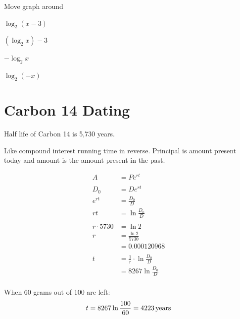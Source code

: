 \documentclass{exam}
\begin{document}
  Move graph around
  \begin{itemize*}
    \item $\log_2 (x - 3)$
    \item $(\log_2 x) - 3$
    \item $- \log_2 x$
    \item $\log_2 (-x)$
  \end{itemize*}
  
  \pagebreak

  \section{Carbon 14 Dating}

  Half life of Carbon 14 is 5,730 years.

  Like compound interest running time in reverse. Principal is amount present today and amount is the amount present in
  the past.

  \begin{align*}
    A      &= P e^{rt} \\
    \\
    D_0    &= D e^{rt} \\
    e^{rt} &= \frac{D_0}{D} \\
    rt     &= \ln{\frac{D_0}{D}} \\
    \\
    r \cdot 5730 &= \ln{2} \\
    r            &= \frac{\ln{2}}{5730} \\
                 &= 0.000120968 \\
    \\
    t &= \frac{1}{r} \cdot \ln{\frac{D_0}{D}} \\
      &= 8267 \ln{\frac{D_0}{D}} \\
  \end{align*}

  When 60 grams out of 100 are left:
  \[
    t = 8267 \ln{\frac{100}{60}} = \unit[4223]{years}
  \]
\end{document}
